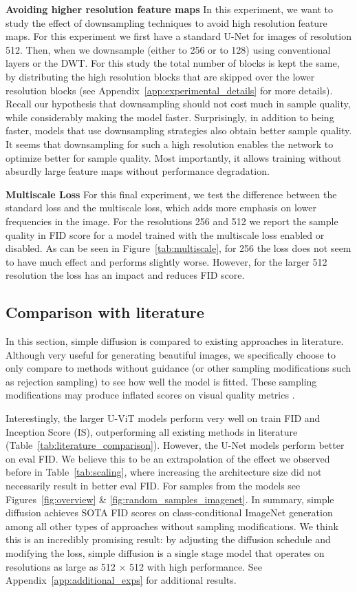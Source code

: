 \textbf{Avoiding higher resolution feature maps}
In this experiment, we want to study the effect of downsampling techniques to avoid high resolution feature maps. For this experiment we first have a standard U-Net for images of resolution 512. Then, when we downsample (either to 256 or to 128) using conventional layers or the DWT. For this study the total number of blocks is kept the same, by distributing the high resolution blocks that are skipped over the lower resolution blocks (see Appendix~\ref{app:experimental_details} for more details). Recall our hypothesis that downsampling should not cost much in sample quality, while considerably making the model faster. Surprisingly, in addition to being faster, models that use downsampling strategies also obtain better sample quality. It seems that downsampling for such a high resolution enables the network to optimize better for sample quality. Most importantly, it allows training without absurdly large feature maps without performance degradation.

\textbf{Multiscale Loss}
For this final experiment, we test the difference between the standard loss and the multiscale loss, which adds more emphasis on lower frequencies in the image. For the resolutions 256 and 512 we report the sample quality in FID score for a model trained with the multiscale loss enabled or disabled. As can be seen in Figure~\ref{tab:multiscale}, for 256 the loss does not seem to have much effect and performs slightly worse. However, for the larger 512 resolution the loss has an impact and reduces FID score. 

\subsection{Comparison with literature}
In this section, simple diffusion is compared to existing approaches in literature. Although very useful for generating beautiful images, we specifically choose to only compare to methods without guidance (or other sampling modifications such as rejection sampling) to see how well the model is fitted. These sampling modifications may produce inflated scores on visual quality metrics \citep{ho2022classifierfreeguidance}.

Interestingly, the larger U-ViT models perform very well on train FID and Inception Score (IS), outperforming all existing methods in literature (Table~\ref{tab:literature_comparison}). However, the U-Net models perform better on eval FID. We believe this to be an extrapolation of the effect we observed before in Table~\ref{tab:scaling}, where increasing the architecture size did not necessarily result in better eval FID. For samples from the models see Figures~\ref{fig:overview} \& \ref{fig:random_samples_imagenet}.
In summary, simple diffusion achieves SOTA FID scores on class-conditional ImageNet generation among all other types of approaches without sampling modifications. We think this is an incredibly promising result: by adjusting the diffusion schedule and modifying the loss, simple diffusion is a single stage model that operates on resolutions as large as 512 $\times$ 512 with high performance. See Appendix~\ref{app:additional_exps} for additional results.

